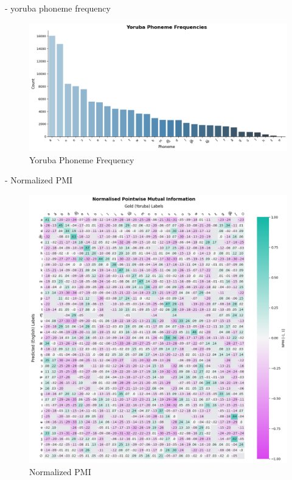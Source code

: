 \documentclass[11pt]{article}
\begin{document}
{- yoruba phoneme frequency
\begin{figure}
    \centering
 \includegraphics[width=1\linewidth]{YorPhonemeFrequency.png}
    \caption{Yoruba Phoneme Frequency}
    \label{fig:placeholder}
\end{figure}



- Normalized PMI
\begin{figure}
    \centering
    \includegraphics[width=1\linewidth]{NormalisedPMI.png}
    \caption{Normalized PMI}
    \label{fig:placeholder}
\end{figure}

}
\end{document}
